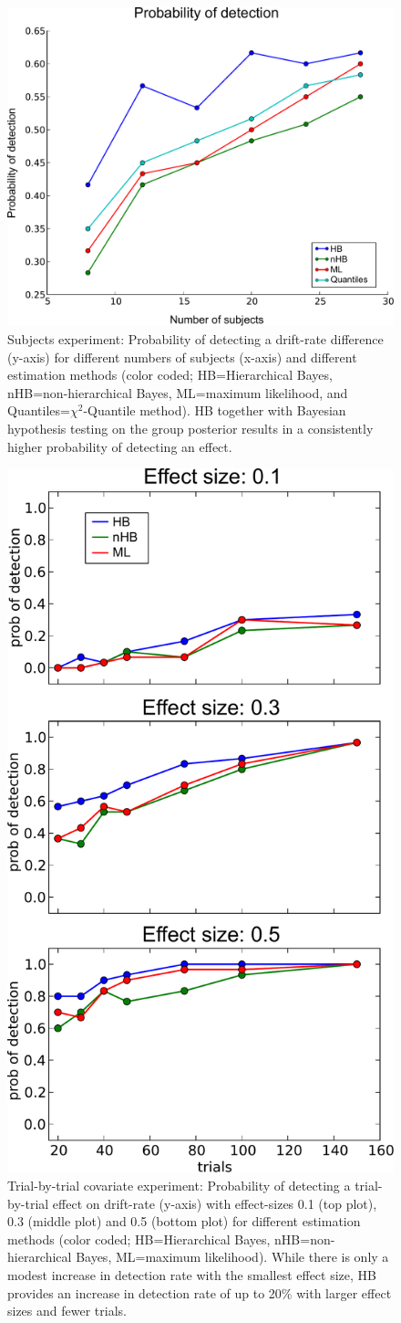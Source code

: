 \documentclass[letterpaper,10pt,english]{article}
\begin{document}
\begin{figure}
\includegraphics[width=.6\columnwidth]{subjs_exp_prob_headings.pdf}
\caption{Subjects experiment: Probability of detecting a drift-rate
difference (y-axis) for different numbers of subjects (x-axis) and
different estimation methods (color coded; HB=Hierarchical Bayes,
nHB=non-hierarchical Bayes, ML=maximum likelihood, and
Quantiles=$\chi^2$-Quantile method). HB together with Bayesian
hypothesis testing on the group posterior results in a consistently
higher probability of detecting an effect.}
\label{fig.subjs}
\end{figure}

\begin{figure}
  \includegraphics[width=.5\columnwidth]{regress_detection_headings.pdf}
\caption{Trial-by-trial covariate experiment: Probability of detecting
a trial-by-trial effect on drift-rate (y-axis) with effect-sizes 0.1
(top plot), 0.3 (middle plot) and 0.5 (bottom plot) for different
estimation methods (color coded; HB=Hierarchical Bayes,
nHB=non-hierarchical Bayes, ML=maximum likelihood). While there is
only a modest increase in detection rate with the smallest effect
size, HB provides an increase in detection rate of up to 20\% with
larger effect sizes and fewer trials.}
\label{fig.regress}
\end{figure}
\end{document}
